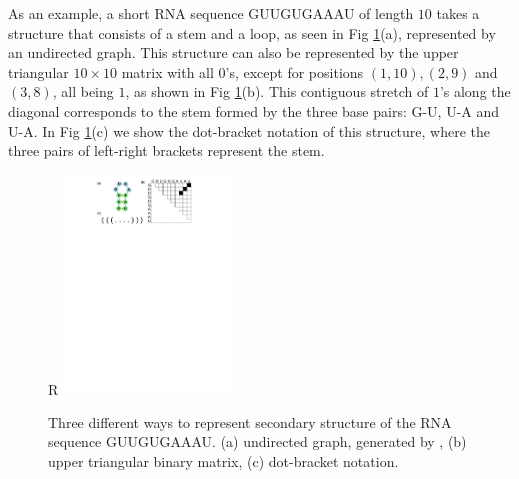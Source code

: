 \documentclass{article}
\begin{document}
As an example, a short RNA sequence GUUGUGAAAU of length $10$
takes a structure that
consists of a stem and a loop, as seen in Fig \ref{fig:rna_ss_binary_mat}(a), represented by an undirected graph.
This structure can also be represented by the upper triangular $10 \times 10$ matrix with all $0$'s,
except for positions
$(1, 10), (2, 9)$ and $(3, 8)$,
all being $1$, as shown in Fig \ref{fig:rna_ss_binary_mat}(b).
This contiguous stretch of $1$'s along the diagonal corresponds to the stem formed by the three base pairs: G-U, U-A and U-A.
In Fig \ref{fig:rna_ss_binary_mat}(c) we show the dot-bracket notation of this structure, where the three pairs
of left-right brackets represent the stem.


\begin{figure}{R}
        \centering
        \includegraphics[width=0.4\textwidth]{plot/rna_ss_binary_mat.pdf}
        \caption{Three different ways to represent secondary structure of the RNA sequence GUUGUGAAAU. (a) undirected graph, generated by \cite{kerpedjiev2015forna}, (b) upper triangular binary matrix, (c) dot-bracket notation.}
        \label{fig:rna_ss_binary_mat}
        \centering
\end{figure}

\end{document}
